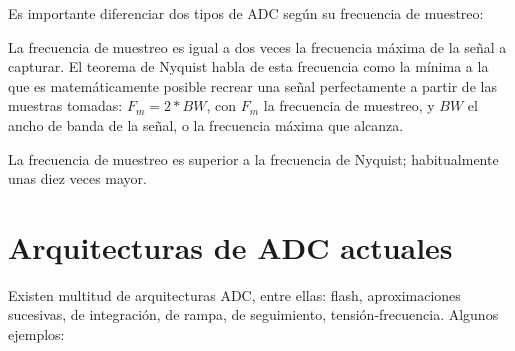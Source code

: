 \documentclass[12pt]{report} %
\begin{document}
	Es importante diferenciar dos tipos de ADC según su frecuencia de muestreo:
	\begin{description}[font=\bfseries, style=multiline, align=left, before={\renewcommand\makelabel[1]{\bfseries ##1:}}]
		\item[A frecuencia de Nyquist] La frecuencia de muestreo es igual a dos veces la frecuencia máxima de la señal a capturar\cite{nyquist}\cite{shannon-nyquist}. El teorema de Nyquist habla de esta frecuencia como la mínima a la que es matemáticamente posible recrear una señal perfectamente a partir de las muestras tomadas: $F_m = 2 * BW$, con $F_m$ la frecuencia de muestreo, y $BW$ el ancho de banda de la señal, o la frecuencia máxima que alcanza.
		\item[Sobremuestreados] La frecuencia de muestreo es superior a la frecuencia de Nyquist; habitualmente unas diez veces mayor.
	\end{description}
	
	\section{Arquitecturas de ADC actuales}
	
	Existen multitud de arquitecturas ADC, entre ellas: flash, aproximaciones sucesivas, de integración, de rampa, de seguimiento, tensión-frecuencia. Algunos ejemplos:
	
\end{document}
